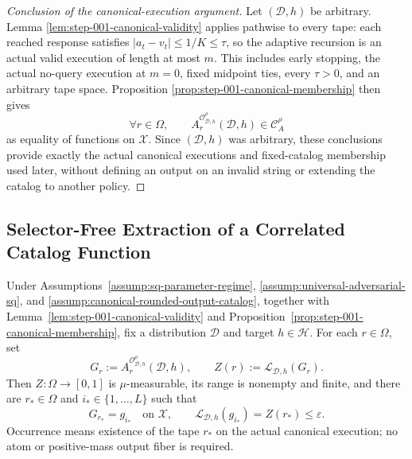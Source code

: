 \begin{proof}[Conclusion of the canonical-execution argument]
Let \((\mathcal D,h)\) be arbitrary.  Lemma
\ref{lem:step-001-canonical-validity} applies pathwise to every tape: each
reached response satisfies \(|a_t-v_t|\le1/K\le\tau\), so the adaptive
recursion is an actual valid execution of length at most \(m\).  This
includes early stopping, the actual no-query execution at \(m=0\), fixed
midpoint ties, every \(\tau>0\), and an arbitrary tape space.  Proposition
\ref{prop:step-001-canonical-membership} then gives
\[
\forall r\in\Omega,
\qquad
A_r^{\mathcal O^{\rho}_{\mathcal D,h}}(\mathcal D,h)
\in\mathcal C_A^{\rho}
\]
as equality of functions on \(\mathcal X\).  Since \((\mathcal D,h)\) was
arbitrary, these conclusions provide exactly the actual canonical executions
and fixed-catalog membership used later, without defining an output on an
invalid string or extending the catalog to another policy.
\end{proof}

\subsection{Selector-Free Extraction of a Correlated Catalog Function}
\label{app:step-002}

\begin{lemma}
\label{lem:step-002-attained-low-risk}
Under Assumptions~\ref{assump:sq-parameter-regime},
\ref{assump:universal-adversarial-sq}, and
\ref{assump:canonical-rounded-output-catalog}, together with
Lemma~\ref{lem:step-001-canonical-validity} and
Proposition~\ref{prop:step-001-canonical-membership}, fix a distribution
\(\mathcal D\) and target \(h\in\mathcal H\).  For each \(r\in\Omega\), set
\[
G_r:=A_r^{\mathcal O^{\rho}_{\mathcal D,h}}(\mathcal D,h),
\qquad
Z(r):=\mathcal L_{\mathcal D,h}(G_r).
\]
Then \(Z:\Omega\to[0,1]\) is \(\mu\)-measurable, its range is nonempty and
finite, and there are \(r_*\in\Omega\) and \(i_*\in\{1,\ldots,L\}\) such
that
\[
G_{r_*}=g_{i_*}\quad\text{on }\mathcal X,
\qquad
\mathcal L_{\mathcal D,h}(g_{i_*})=Z(r_*)\le\varepsilon.
\]
Occurrence means existence of the tape \(r_*\) on the actual canonical
execution; no atom or positive-mass output fiber is required.
\end{lemma}

